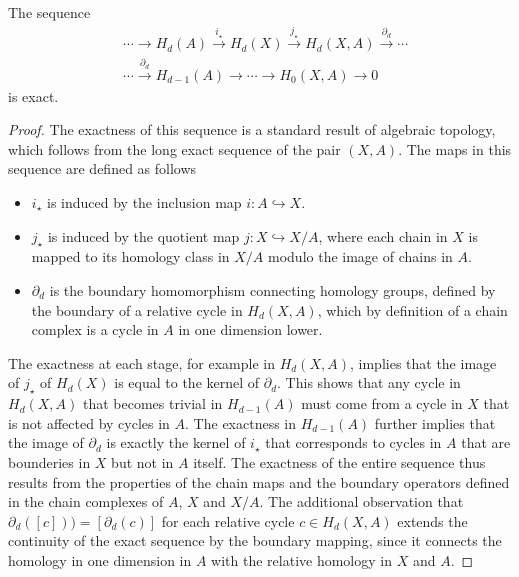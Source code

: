 \begin{proposition}{\cite[Theorem 2.16]{hatcher2005algebraic}}
	The sequence
	\begin{align}
		  & \cdots \rightarrow H_{d}(A) \xrightarrow{i_\star}H_{d}(X) \xrightarrow{j_\star} 
		H_{d}(X,A) \xrightarrow{\partial_d} \cdots \\
		  & \cdots \xrightarrow{\partial_d} H_{d-1}(A) \rightarrow \cdots \rightarrow       
		H_{0}(X,A) \rightarrow 0
	\end{align}
	is exact.
\end{proposition}

\begin{proof}
	The exactness of this sequence is a standard result of algebraic topology, which follows from the long exact sequence of the pair \((X, A)\). The maps in this sequence are defined as follows
	\begin{itemize}
		\item \(i_{\star}\) is induced by the inclusion map \(i: A \hookrightarrow X\).
		\item \(j_{\star}\) is induced by the quotient map \(j: X \hookrightarrow X/A\), where each chain in \(X\) is mapped to its homology class in \(X/A\) modulo the image of chains in \(A\).
		\item \(\partial_{d}\) is the boundary homomorphism connecting homology groups, defined by the boundary of a relative cycle in \(H_{d}(X, A)\), which by definition of a chain complex is a cycle in \(A\) in one dimension lower.
	\end{itemize}
	The exactness at each stage, for example in \(H_{d}(X, A)\), implies that the image of \(j_{\star}\) of \(H_{d}(X)\) is equal to the kernel of \(\partial_{d}\). This shows that any cycle in \(H_{d}(X, A)\) that becomes trivial in \(H_{d-1}(A)\) must come from a cycle in \(X\) that is not affected by cycles in \(A\). The exactness in \(H_{d-1}(A)\) further implies that the image of \(\partial_{d}\) is exactly the kernel of \(i_{\star}\) that corresponds to cycles in \(A\) that are bounderies in \(X\) but not in \(A\) itself. The exactness of the entire sequence thus results from the properties of the chain maps and the boundary operators defined in the chain complexes of \(A\), \(X\) and \(X/A\). The additional observation that \(\partial_{d}([c])) = [\partial_{d}(c)]\) for each relative cycle \(c \in H_{d}(X, A)\) extends the continuity of the exact sequence by the boundary mapping, since it connects the homology in one dimension in \(A\) with the relative homology in \(X\) and \(A\).
\end{proof}


